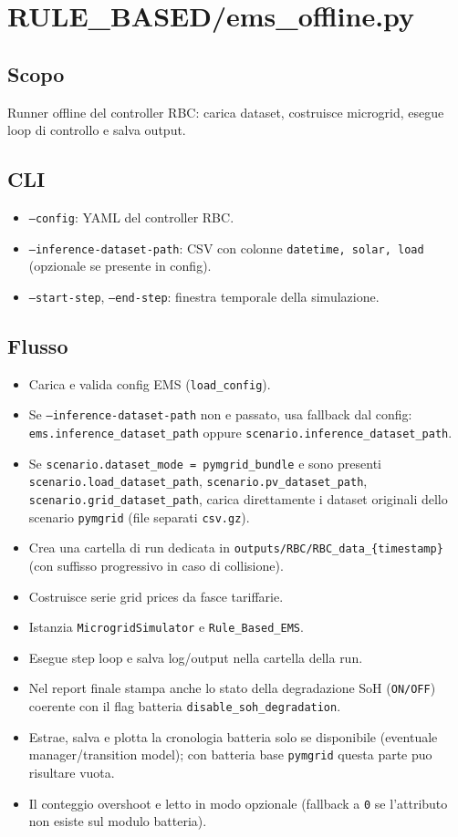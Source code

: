 \section{RULE\_BASED/ems\_offline.py}

\subsection*{Scopo}
Runner offline del controller RBC: carica dataset, costruisce microgrid, esegue loop di controllo e salva output.

\subsection*{CLI}
\begin{itemize}[leftmargin=1.2cm]
\item \texttt{--config}: YAML del controller RBC.
\item \texttt{--inference-dataset-path}: CSV con colonne \texttt{datetime, solar, load} (opzionale se presente in config).
\item \texttt{--start-step}, \texttt{--end-step}: finestra temporale della simulazione.
\end{itemize}

\subsection*{Flusso}
\begin{itemize}[leftmargin=1.2cm]
\item Carica e valida config EMS (\texttt{load\_config}).
\item Se \texttt{--inference-dataset-path} non e passato, usa fallback dal config:
\texttt{ems.inference\_dataset\_path} oppure \texttt{scenario.inference\_dataset\_path}.
\item Se \texttt{scenario.dataset\_mode = pymgrid\_bundle} e sono presenti
\texttt{scenario.load\_dataset\_path}, \texttt{scenario.pv\_dataset\_path}, \texttt{scenario.grid\_dataset\_path},
carica direttamente i dataset originali dello scenario \texttt{pymgrid} (file separati \texttt{csv.gz}).
\item Crea una cartella di run dedicata in \texttt{outputs/RBC/RBC\_data\_\{timestamp\}} (con suffisso progressivo in caso di collisione).
\item Costruisce serie grid prices da fasce tariffarie.
\item Istanzia \texttt{MicrogridSimulator} e \texttt{Rule\_Based\_EMS}.
\item Esegue step loop e salva log/output nella cartella della run.
\item Nel report finale stampa anche lo stato della degradazione SoH (\texttt{ON/OFF}) coerente con il flag batteria \texttt{disable\_soh\_degradation}.
\item Estrae, salva e plotta la cronologia batteria solo se disponibile (eventuale manager/transition model); con batteria base \texttt{pymgrid} questa parte puo risultare vuota.
\item Il conteggio overshoot e letto in modo opzionale (fallback a \texttt{0} se l'attributo non esiste sul modulo batteria).
\end{itemize}

